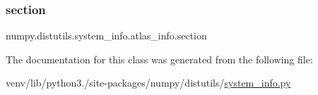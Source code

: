 \mbox{\label{classnumpy_1_1distutils_1_1system__info_1_1atlas__info_a783f1730add6eb0d13c309da60175318}} 
\subsubsection{\texorpdfstring{section}{section}}
{\footnotesize\ttfamily numpy.\+distutils.\+system\+\_\+info.\+atlas\+\_\+info.\+section\hspace{0.3cm}{\ttfamily [static]}}



The documentation for this class was generated from the following file\+:\begin{DoxyCompactItemize}
\item 
venv/lib/python3./site-\/packages/numpy/distutils/\hyperlink{system__info_8py}{system\+\_\+info.\+py}\end{DoxyCompactItemize}
